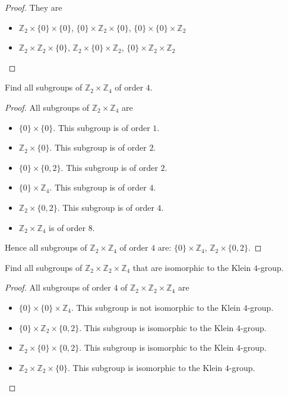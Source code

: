 \begin{proof}
    They are
    \begin{itemize}
        \item $\mathbb{Z}_{2}\times\{0\}\times\{0\}$, $\{0\}\times\mathbb{Z}_{2}\times\{0\}$, $\{0\}\times\{0\}\times\mathbb{Z}_{2}$
        \item $\mathbb{Z}_{2}\times\mathbb{Z}_{2}\times\{0\}$, $\mathbb{Z}_{2}\times\{0\}\times\mathbb{Z}_{2}$, $\{0\}\times\mathbb{Z}_{2}\times\mathbb{Z}_{2}$
    \end{itemize}
\end{proof}

\begin{exercise}
    Find all subgroups of $\mathbb{Z}_{2}\times\mathbb{Z}_{4}$ of order $4$.
\end{exercise}

\begin{proof}
    All subgroups of $\mathbb{Z}_{2}\times\mathbb{Z}_{4}$ are
    \begin{itemize}
        \item $\{0\}\times\{0\}$. This subgroup is of order $1$.
        \item $\mathbb{Z}_{2}\times\{0\}$. This subgroup is of order $2$.
        \item $\{0\}\times\{0,2\}$. This subgroup is of order $2$.
        \item $\{0\}\times\mathbb{Z}_{4}$. This subgroup is of order $4$.
        \item $\mathbb{Z}_{2}\times\{ 0, 2 \}$. This subgroup is of order $4$.
        \item $\mathbb{Z}_{2}\times\mathbb{Z}_{4}$ is of order $8$.
    \end{itemize}

    Hence all subgroups of $\mathbb{Z}_{2}\times\mathbb{Z}_{4}$ of order $4$ are: $\{0\}\times\mathbb{Z}_{4}$, $\mathbb{Z}_{2}\times\{0,2\}$.
\end{proof}

\begin{exercise}
    Find all subgroups of $\mathbb{Z}_{2}\times\mathbb{Z}_{2}\times\mathbb{Z}_{4}$ that are isomorphic to the Klein $4$-group.
\end{exercise}

\begin{proof}
    All subgroups of order $4$ of $\mathbb{Z}_{2}\times\mathbb{Z}_{2}\times\mathbb{Z}_{4}$ are
    \begin{itemize}
        \item $\{0\}\times\{0\}\times\mathbb{Z}_{4}$. This subgroup is not isomorphic to the Klein $4$-group.
        \item $\{0\}\times\mathbb{Z}_{2}\times\{0,2\}$. This subgroup is isomorphic to the Klein $4$-group.
        \item $\mathbb{Z}_{2}\times\{0\}\times\{0,2\}$. This subgroup is isomorphic to the Klein $4$-group.
        \item $\mathbb{Z}_{2}\times\mathbb{Z}_{2}\times\{0\}$. This subgroup is isomorphic to the Klein $4$-group.
    \end{itemize}
\end{proof}

